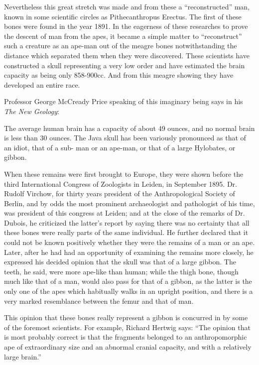 Nevertheless this great stretch was made and from these a ``reconstructed'' man, known in
some scientific circles as Pithecanthropus Erectus. The first of these bones were found in the
year 1891. In the eagerness of these researches to prove the descent of man from the apes, it
became a simple matter to ``reconstruct'' such a creature as an ape-man out of the meagre
bones notwithstanding the distance which separated them when they were discovered. These
scientists have constructed a skull representing a very low order and have estimated the brain
capacity as being only 858-900cc. And from this meagre showing they have developed an
entire race.

Professor George McCready Price speaking of this imaginary being says in his \textit{The New
Geology}:

The average human brain has a capacity of about 49 ounces, and no normal brain is less than
30 ounces. The Java skull has been variously pronounced as that of an idiot, that of a sub-
man or an ape-man, or that of a large Hylobates, or gibbon.

When these remains were first brought to Europe, they were shown before the third
International Congress of Zoologists in Leiden, in September 1895. Dr. Rudolf Virchow, for
thirty years president of the Anthropological Society of Berlin, and by odds the most
prominent archaeologist and pathologist of his time, was president of this congress at Leiden;
and at the close of the remarks of Dr. Dubois, he criticized the latter's report by saying there
was no certainty that all these bones were really parts of the same individual. He further
declared that it could not be known positively whether they were the remains of a man or an
ape. Later, after he had had an opportunity of examining the remains more closely, he
expressed his decided opinion that the skull was that of a large gibbon. The teeth, he said,
were more ape-like than human; while the thigh bone, though much like that of a man, would
also pass for that of a gibbon, as the latter is the only one of the apes which habitually walks
in an upright position, and there is a very marked resemblance between the femur and that of
man.

This opinion that these bones really represent a gibbon is concurred in by some of the
foremost scientists. For example, Richard Hertwig says: ``The opinion that is most probably
correct is that the fragments belonged to an anthropomorphic ape of extraordinary size and an
abnormal cranial capacity, and with a relatively large brain.''

